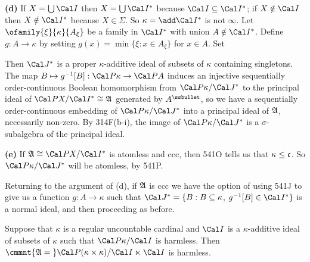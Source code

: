 {{\bf (d)} If $X=\bigcup\Cal I$ then $X=\bigcup\Cal I^*$ because
$\Cal I\subseteq\Cal I^*$;  if $X\notin\Cal I$ then $X\notin\Cal I^*$
because $X\in\Sigma$.   So $\kappa=\add\Cal I^*$ is not $\infty$.   Let
$\ofamily{\xi}{\kappa}{A_{\xi}}$ be a family in $\Cal I^*$ with union
$A\notin\Cal I^*$.   Define $g:A\to\kappa$ by setting $g(x)=\min\{\xi:x\in A_{\xi}\}$
for $x\in A$.   Set


\noindent
Then $\Cal J^*$ is a proper $\kappa$-additive ideal of subsets of $\kappa$ containing
singletons.
The map $B\mapsto g^{-1}[B]:\Cal P\kappa\to\Cal PA$ induces an injective
sequentially
order-continuous Boolean homomorphism from $\Cal P\kappa/\Cal J^*$ to
the principal ideal of $\Cal PX/\Cal I^*\cong\frak A$ generated by
$A^{\ssbullet}$, so we have a sequentially order-continuous embedding of
$\Cal P\kappa/\Cal J^*$ into a
principal ideal of $\frak A$, necessarily non-zero.   By 314F(b-i),
the image of
$\Cal P\kappa/\Cal J^*$ is a $\sigma$-subalgebra of the principal ideal.

\medskip

{\bf (e)} If $\frak A\cong\Cal PX/\Cal I^*$ is atomless and ccc,
then 541O tells us
that $\kappa\le\frak c$.   So $\Cal P\kappa/\Cal J^*$ will be atomless,
by 541P.

Returning to the argument of (d), if $\frak A$ is ccc we have the option
of using 541J to give us a function $g:A\to\kappa$ such that
$\Cal J^*=\{B:B\subseteq\kappa$, $g^{-1}[B]\in\Cal I^*\}$
is a normal ideal, and then proceeding as before.
}%

 Suppose that $\kappa$ is a regular uncountable
cardinal and $\Cal I$ is a $\kappa$-additive
ideal of subsets of $\kappa$ such that $\Cal P\kappa/\Cal I$ is
harmless.   Then
$\cmmnt{\frak A=\mskip5mu}\Cal P(\kappa\times\kappa)/\Cal I\ltimes\Cal I$ is harmless.

